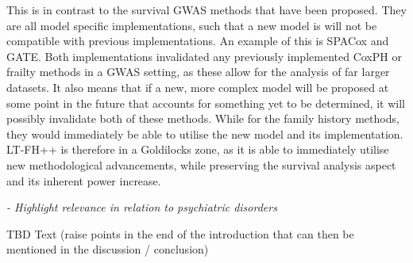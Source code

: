 This is in contrast to the survival GWAS methods that have been proposed. They are all model specific implementations, such that a new model is will not be compatible with previous implementations. An example of this is SPACox and GATE. Both implementations invalidated any previously implemented CoxPH or frailty methods in a GWAS setting, as these allow for the analysis of far larger datasets. It also means that if a new, more complex model will be proposed at some point in the future that accounts for something yet to be determined, it will possibly invalidate both of these methods. While for the family history methods, they would immediately be able to utilise the new model and its implementation. LT-FH++ is therefore in a Goldilocks zone, as it is able to immediately utilise new methodological advancements, while preserving the survival analysis aspect and its inherent power increase.    

{\itshape
- Highlight relevance in relation to psychiatric disorders
}

TBD Text (raise points in the end of the introduction that can then be mentioned in the discussion / conclusion)